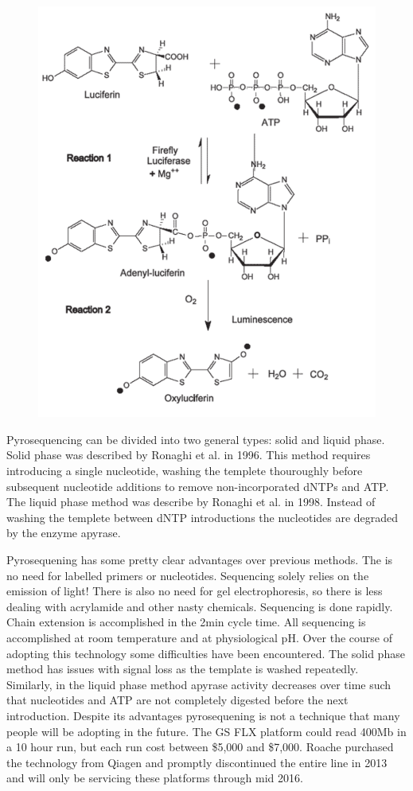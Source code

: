 \documentclass{report}\usepackage[]{graphicx}\usepackage[]{color}
\begin{document}
\begin{figure}[H]
\centering
    \includegraphics[width=.5\textwidth]{images/Luciferase.pdf}
    \caption{}\label{fig:Pyro} 
\end{figure}

Pyrosequencing can be divided into two general types: solid and liquid phase. Solid phase was described
by Ronaghi et al. in 1996. This method requires introducing a single nucleotide, washing the templete 
thouroughly before subsequent nucleotide additions to remove non-incorporated dNTPs and ATP. The
liquid phase method was describe by Ronaghi et al. in 1998. Instead of washing the templete between
dNTP introductions the nucleotides are degraded by the enzyme apyrase.
 
Pyrosequening has some pretty clear advantages over previous methods. The is no need for
labelled primers or nucleotides. Sequencing solely relies on the emission of light! There is also
no need for gel electrophoresis, so there is less dealing with acrylamide and other nasty chemicals.
Sequencing is done rapidly. Chain extension is accomplished in the 2min cycle time. All sequencing is
accomplished at room temperature and at physiological pH. Over the course of adopting this technology
some difficulties have been encountered. The solid phase method has issues with signal loss as the template
is washed repeatedly. Similarly, in the liquid phase method apyrase activity decreases over time such that
nucleotides and ATP are not completely digested before the next introduction. Despite its advantages  
pyrosequening is not a technique that many people will be adopting in the future. The GS FLX platform 
could read 400Mb in a 10 hour run, but each run cost between \$5,000 and \$7,000. 
Roache purchased the technology from Qiagen and promptly discontinued the entire line in 2013 and will
only be servicing these platforms through mid 2016. 
\end{document}
